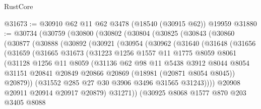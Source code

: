 \begin{lexlean}{RustCore}
\begin{coremodule}
@31673 := @30910 @62 @11 @62 @3478 (@18540 (@30915 @62)) @19959
@31880 := @30734
    (@30759
      (@30800
        (@30802
          (@30804
            (@30825
              (@30843
                (@30860
                  (@30877
                    (@30888
                      (@30892
                        (@30921
                          (@30954
                            (@30962
                              (@31640
                                (@31648
                                  (@31656
                                    (@31659
                                      (@31665
                                        @31673
                                        (@31223
                                          @1256
                                          @1557
                                          @11
                                          @1775
                                          @8059
                                          @8061
                                          (@31128
                                            @1256
                                            @11
                                            @8059
                                            (@31136
                                              @62
                                              @98
                                              @11
                                              @5438
                                              @3912
                                              @8044
                                              @8054
                                              @31151
                                              @20841
                                              @20849
                                              @20866
                                              @20869
                                              (@18981 (@20871 @8054 @8045))
                                              @20879))
                                          (@31552 @285 @27 @30 @3906 @3496 @31565 @31243))))
                                    @20908
                                    @20911
                                    @20914
                                    @20917
                                    @20879)
                                  @31271))
                              (@30925
                                @8068
                                @1577
                                @870
                                @203
                                @3405
                                @8088

\end{coremodule}
\end{lexlean}

